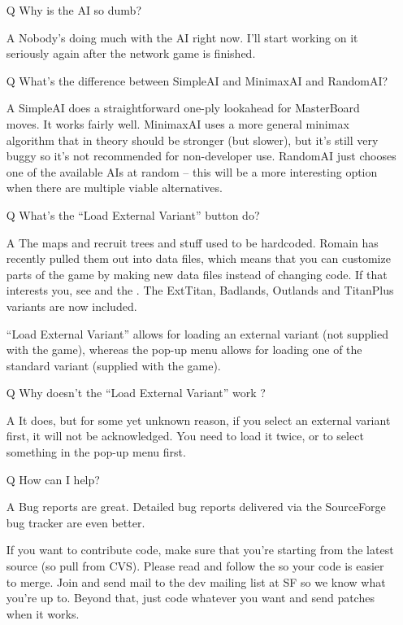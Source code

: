 \documentclass{article}
\begin{document}
\begin{itemize}
\item[Q] Why is the AI so dumb?

\item[A] Nobody's doing much with the AI right now. I'll start working
 on it seriously again after the network game is finished.


\item[Q] What's the difference between SimpleAI and MinimaxAI and RandomAI?

\item[A] SimpleAI does a straightforward one-ply lookahead for MasterBoard
 moves. It works fairly well. MinimaxAI uses a more general minimax 
 algorithm that in theory should be stronger (but slower), but it's 
 still very buggy so it's not recommended for non-developer use. 
 RandomAI just chooses one of the available AIs at random -- this 
 will be a more interesting option when there are multiple viable 
 alternatives.


\item[Q] What's the ``Load External Variant'' button do? 

\item[A] The maps and recruit trees and stuff used to be hardcoded. Romain
 has recently pulled them out into data files, which means that you
 can customize parts of the game by making new data files instead of
 changing code. If that interests you, see
 and the
 .
 The ExtTitan, Badlands, Outlands and TitanPlus variants are now included.

 ``Load External Variant'' allows for loading an external variant
 (not supplied with the game), whereas the pop-up menu allows
 for loading one of the standard variant (supplied with the game).


\item[Q] Why doesn't the ``Load External Variant'' work ?

\item[A] It does, but for some yet unknown reason, if you select an external
 variant first, it will not be acknowledged. You need to load it
 twice, or to select something in the pop-up menu first.


\item[Q] How can I help?

\item[A] Bug reports are great. Detailed bug reports delivered via the 
 SourceForge bug tracker are even better. 
 
 If you want to contribute code, make sure that you're starting 
 from the latest source (so pull from CVS). Please read and follow
 the 
 so your code is easier to merge. Join and send mail to the dev mailing
 list at SF so we know what you're up to. Beyond that, just code whatever
 you want and send  patches when it works.

\end{itemize}
\end{document}
